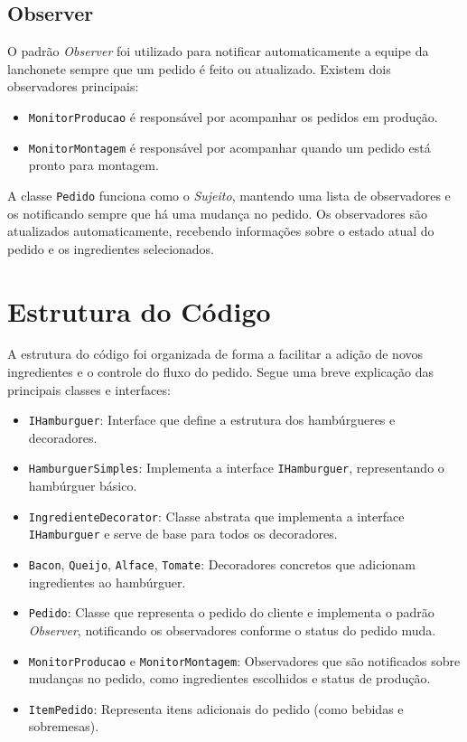 \documentclass[a4paper,12pt]{article}
\begin{document}
\subsection{Observer}
O padrão \textit{Observer} foi utilizado para notificar automaticamente a equipe da lanchonete sempre que um pedido é feito ou atualizado. Existem dois observadores principais:

\begin{itemize}
    \item \texttt{MonitorProducao} é responsável por acompanhar os pedidos em produção.
    \item \texttt{MonitorMontagem} é responsável por acompanhar quando um pedido está pronto para montagem.
\end{itemize}

A classe \texttt{Pedido} funciona como o \textit{Sujeito}, mantendo uma lista de observadores e os notificando sempre que há uma mudança no pedido. Os observadores são atualizados automaticamente, recebendo informações sobre o estado atual do pedido e os ingredientes selecionados.

\section{Estrutura do Código}
A estrutura do código foi organizada de forma a facilitar a adição de novos ingredientes e o controle do fluxo do pedido. Segue uma breve explicação das principais classes e interfaces:

\begin{itemize}
    \item \texttt{IHamburguer}: Interface que define a estrutura dos hambúrgueres e decoradores.
    \item \texttt{HamburguerSimples}: Implementa a interface \texttt{IHamburguer}, representando o hambúrguer básico.
    \item \texttt{IngredienteDecorator}: Classe abstrata que implementa a interface \texttt{IHamburguer} e serve de base para todos os decoradores.
    \item \texttt{Bacon}, \texttt{Queijo}, \texttt{Alface}, \texttt{Tomate}: Decoradores concretos que adicionam ingredientes ao hambúrguer.
    \item \texttt{Pedido}: Classe que representa o pedido do cliente e implementa o padrão \textit{Observer}, notificando os observadores conforme o status do pedido muda.
    \item \texttt{MonitorProducao} e \texttt{MonitorMontagem}: Observadores que são notificados sobre mudanças no pedido, como ingredientes escolhidos e status de produção.
    \item \texttt{ItemPedido}: Representa itens adicionais do pedido (como bebidas e sobremesas).
\end{itemize}
\end{document}
